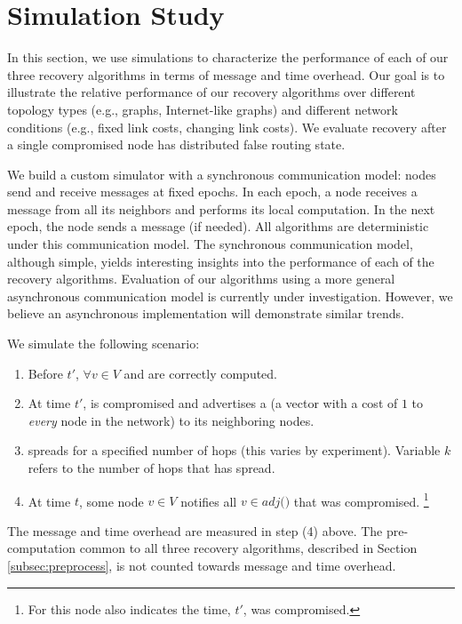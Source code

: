 \section{Simulation Study}
\label{sec:eval}

In this section, we use simulations to characterize the performance of each of our three recovery algorithms in terms of message and time overhead. 
Our goal is to illustrate the relative performance of our recovery algorithms over different topology types (e.g., \er graphs, Internet-like graphs) and
different network conditions (e.g., fixed link costs, changing link costs).
We evaluate recovery after a single compromised node has distributed false routing state.

We build a custom simulator with a synchronous communication model: nodes send and receive messages at fixed epochs.  In each epoch, a node receives a
message from all its neighbors and performs its local computation.  In
the next epoch, the node sends a message (if needed).   All algorithms
are deterministic under this communication model.
The synchronous communication model, although simple, yields
interesting insights into the performance of each of the recovery
algorithms. Evaluation of our algorithms using a more general
asynchronous communication model is currently under
investigation. However, we believe an asynchronous implementation
will demonstrate similar trends.  

We simulate the following scenario:

\begin{enumerate}
	\item Before $t'$, $\forall v \in V$ \minvv and \dmatrixv are correctly computed.

	\item At time $t'$, \bad is compromised and advertises a \badvector (a vector with a cost of $1$ to \emph{every} node in the network) to its neighboring nodes.

	\item \badvector spreads for a specified number of hops (this varies by experiment).  Variable $k$ refers to the number of hops that \badvector has spread.

	\item At time $t$, some node $v \in V$ notifies all $v \in adj($\bads$)$ that \bad was compromised. 
	{\footnote { \small For \cpr this node also indicates the time, $t'$, \bad was compromised.}} 

\end{enumerate}
The message and time overhead are measured in step (4) above. The pre-computation common to all three recovery algorithms, described in Section \ref{subsec:preprocess},
is not counted towards message and time overhead.


